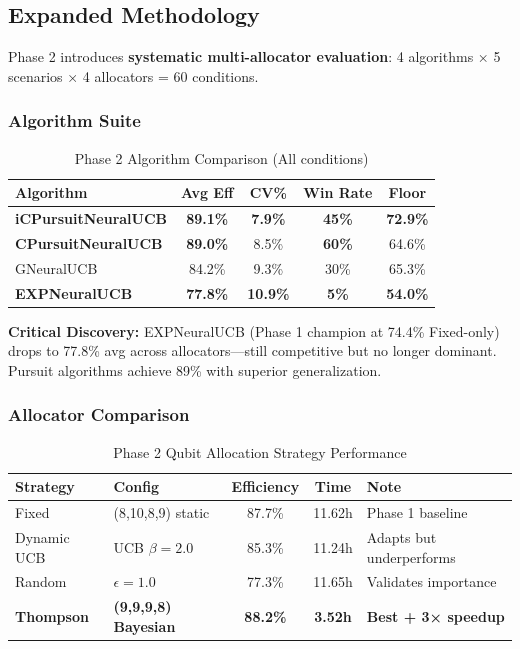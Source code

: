 \documentclass[11pt,a4paper]{article}
\newcommand{\critical}[1]{\textcolor{criticalcolor}{\textbf{#1}}}
\newcommand{\success}[1]{\textcolor{successcolor}{\textbf{#1}}}
\begin{document}
\subsection{Expanded Methodology}

Phase 2 introduces \textbf{systematic multi-allocator evaluation}: 4 algorithms × 5 scenarios × 4 allocators = 60 conditions.

\subsubsection{Algorithm Suite}

\begin{table}[h]
\centering\small
\caption{Phase 2 Algorithm Comparison (All conditions)}
\begin{tabular}{lcccc}
\toprule
\textbf{Algorithm} & \textbf{Avg Eff} & \textbf{CV\%} & \textbf{Win Rate} & \textbf{Floor} \\
\midrule
\success{iCPursuitNeuralUCB} & \success{89.1\%} & \success{7.9\%} & \success{45\%} & \success{72.9\%} \\
\success{CPursuitNeuralUCB} & \success{89.0\%} & 8.5\% & \success{60\%} & 64.6\% \\
GNeuralUCB & 84.2\% & 9.3\% & 30\% & 65.3\% \\
\critical{EXPNeuralUCB} & \critical{77.8\%} & \critical{10.9\%} & \critical{5\%} & \critical{54.0\%} \\
\bottomrule
\end{tabular}
\end{table}

\textbf{Critical Discovery:} EXPNeuralUCB (Phase 1 champion at 74.4\% Fixed-only) drops to 77.8\% avg across allocators—still competitive but no longer dominant. Pursuit algorithms achieve 89\% with superior generalization.

\subsubsection{Allocator Comparison}

\begin{table}[h]
\centering\footnotesize
\caption{Phase 2 Qubit Allocation Strategy Performance}
\begin{tabular}{lp{2.5cm}ccp{3cm}}
\toprule
\textbf{Strategy} & \textbf{Config} & \textbf{Efficiency} & \textbf{Time} & \textbf{Note} \\
\midrule
Fixed & (8,10,8,9) static & 87.7\% & 11.62h & Phase 1 baseline \\
Dynamic UCB & UCB $\beta=2.0$ & 85.3\% & 11.24h & Adapts but underperforms \\
Random & $\epsilon=1.0$ & 77.3\% & 11.65h & Validates importance \\
\success{Thompson} & \success{(9,9,9,8) Bayesian} & \success{88.2\%} & \success{3.52h} & \success{Best + 3× speedup} \\
\bottomrule
\end{tabular}
\end{table}
\end{document}
